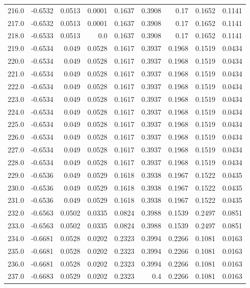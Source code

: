 \begin{longtable}{lrrrrrrrr}
216.0 & -0.6532 & 0.0513 & 0.0001 & 0.1637 & 0.3908 & 0.17 & 0.1652 & 0.1141 \\
217.0 & -0.6532 & 0.0513 & 0.0001 & 0.1637 & 0.3908 & 0.17 & 0.1652 & 0.1141 \\
218.0 & -0.6533 & 0.0513 & 0.0 & 0.1637 & 0.3908 & 0.17 & 0.1652 & 0.1141 \\
219.0 & -0.6534 & 0.049 & 0.0528 & 0.1617 & 0.3937 & 0.1968 & 0.1519 & 0.0434 \\
220.0 & -0.6534 & 0.049 & 0.0528 & 0.1617 & 0.3937 & 0.1968 & 0.1519 & 0.0434 \\
221.0 & -0.6534 & 0.049 & 0.0528 & 0.1617 & 0.3937 & 0.1968 & 0.1519 & 0.0434 \\
222.0 & -0.6534 & 0.049 & 0.0528 & 0.1617 & 0.3937 & 0.1968 & 0.1519 & 0.0434 \\
223.0 & -0.6534 & 0.049 & 0.0528 & 0.1617 & 0.3937 & 0.1968 & 0.1519 & 0.0434 \\
224.0 & -0.6534 & 0.049 & 0.0528 & 0.1617 & 0.3937 & 0.1968 & 0.1519 & 0.0434 \\
225.0 & -0.6534 & 0.049 & 0.0528 & 0.1617 & 0.3937 & 0.1968 & 0.1519 & 0.0434 \\
226.0 & -0.6534 & 0.049 & 0.0528 & 0.1617 & 0.3937 & 0.1968 & 0.1519 & 0.0434 \\
227.0 & -0.6534 & 0.049 & 0.0528 & 0.1617 & 0.3937 & 0.1968 & 0.1519 & 0.0434 \\
228.0 & -0.6534 & 0.049 & 0.0528 & 0.1617 & 0.3937 & 0.1968 & 0.1519 & 0.0434 \\
229.0 & -0.6536 & 0.049 & 0.0529 & 0.1618 & 0.3938 & 0.1967 & 0.1522 & 0.0435 \\
230.0 & -0.6536 & 0.049 & 0.0529 & 0.1618 & 0.3938 & 0.1967 & 0.1522 & 0.0435 \\
231.0 & -0.6536 & 0.049 & 0.0529 & 0.1618 & 0.3938 & 0.1967 & 0.1522 & 0.0435 \\
232.0 & -0.6563 & 0.0502 & 0.0335 & 0.0824 & 0.3988 & 0.1539 & 0.2497 & 0.0851 \\
233.0 & -0.6563 & 0.0502 & 0.0335 & 0.0824 & 0.3988 & 0.1539 & 0.2497 & 0.0851 \\
234.0 & -0.6681 & 0.0528 & 0.0202 & 0.2323 & 0.3994 & 0.2266 & 0.1081 & 0.0163 \\
235.0 & -0.6681 & 0.0528 & 0.0202 & 0.2323 & 0.3994 & 0.2266 & 0.1081 & 0.0163 \\
236.0 & -0.6681 & 0.0528 & 0.0202 & 0.2323 & 0.3994 & 0.2266 & 0.1081 & 0.0163 \\
237.0 & -0.6683 & 0.0529 & 0.0202 & 0.2323 & 0.4 & 0.2266 & 0.1081 & 0.0163 \\

\end{longtable}
